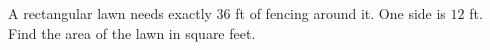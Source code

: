 A rectangular lawn needs exactly $36$ ft of fencing around it. One side is $12$ ft. Find the area of the lawn in square feet.
